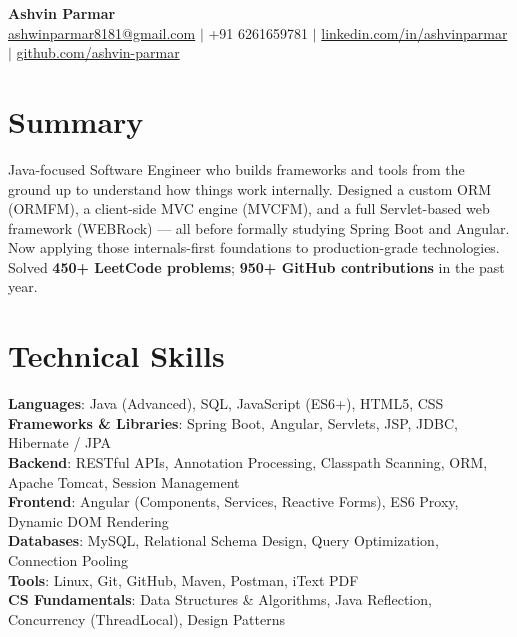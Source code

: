 \documentclass[a4paper,10pt]{article}
\begin{document}
\begin{center}
    {\LARGE \textbf{Ashvin Parmar}}\\
    \vspace{1mm}
    \href{mailto:ashwinparmar8181@gmail.com}{ashwinparmar8181@gmail.com} $|$
    +91 6261659781 $|$
    \href{https://www.linkedin.com/in/ashvinparmar/}{linkedin.com/in/ashvinparmar} $|$
    \href{https://github.com/ashvin-parmar}{github.com/ashvin-parmar}
\end{center}

\section*{Summary}
Java-focused Software Engineer who builds frameworks and tools from the ground up to understand how things work internally. Designed a custom ORM (ORMFM), a client-side MVC engine (MVCFM), and a full Servlet-based web framework (WEBRock) --- all before formally studying Spring Boot and Angular. Now applying those internals-first foundations to production-grade technologies. Solved \textbf{450+ LeetCode problems}; \textbf{950+ GitHub contributions} in the past year.

\section*{Technical Skills}
\textbf{Languages}: Java (Advanced), SQL, JavaScript (ES6+), HTML5, CSS \\
\textbf{Frameworks \& Libraries}: Spring Boot, Angular, Servlets, JSP, JDBC, Hibernate / JPA \\
\textbf{Backend}: RESTful APIs, Annotation Processing, Classpath Scanning, ORM, Apache Tomcat, Session Management \\
\textbf{Frontend}: Angular (Components, Services, Reactive Forms), ES6 Proxy, Dynamic DOM Rendering \\
\textbf{Databases}: MySQL, Relational Schema Design, Query Optimization, Connection Pooling \\
\textbf{Tools}: Linux, Git, GitHub, Maven, Postman, iText PDF \\
\textbf{CS Fundamentals}: Data Structures \& Algorithms, Java Reflection, Concurrency (ThreadLocal), Design Patterns

\end{document}
